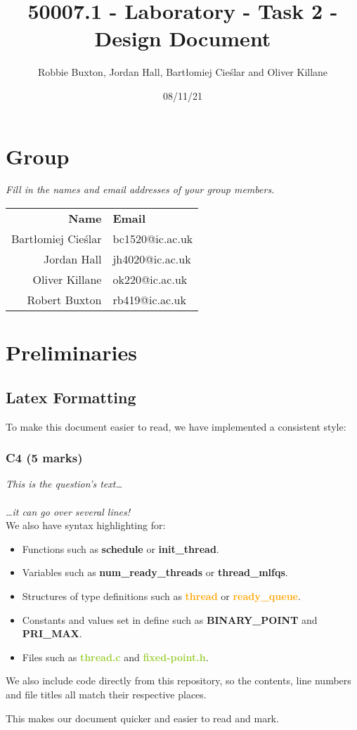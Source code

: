 \documentclass{report}
\title{50007.1 - Laboratory - Task 2 - Design Document}
\author{Robbie Buxton, Jordan Hall, Bartłomiej Cieślar and Oliver Killane}
\date{08/11/21}
\newcommand{\question}[1]{\textit{#1} \ }
\newcommand{\fun}[1]{\textcolor{Emerald}{\textbf{#1}}}
\newcommand{\file}[1]{\textcolor{YellowGreen}{\textbf{#1}}}
\newcommand{\struct}[1]{\textcolor{orange}{\textbf{#1}}}
\newcommand{\var}[1]{\textcolor{RoyalPurple}{\textbf{#1}}}
\newcommand{\const}[1]{\textcolor{BrickRed}{\textbf{#1}}}
\newcommand{\pintoscode}[4]{}
\newcommand{\pintosfile}[3]{\pintoscode{#1}{#2}{\file{#3}}{#3}}
\begin{document}
    \maketitle

    \section*{Group}
        \question{Fill in the names and email addresses of your group members.}
        \begin{center}
            \begin{tabular}{r l}
                \textbf{Name} & \textbf{Email} \\
                Bartłomiej Cieślar & bc1520@ic.ac.uk \\
                Jordan Hall & jh4020@ic.ac.uk \\
                Oliver Killane & ok220@ic.ac.uk \\
                Robert Buxton & rb419@ic.ac.uk \\
            \end{tabular}
        \end{center}
    
    \section*{Preliminaries}
        \subsection*{Latex Formatting}
        To make this document easier to read, we have implemented a consistent style:
        \subsubsection*{C4 (5 marks)}
        \question{This is the question's text\dots
        \\
        \\ \dots it can go over several lines!}
        \\ We also have syntax highlighting for:
        \begin{itemize}
            \item Functions such as \fun{schedule} or \fun{init\_thread}.
            \item Variables such as \var{num\_ready\_threads} or \var{thread\_mlfqs}.
            \item Structures of type definitions such as \struct{thread} or \struct{ready\_queue}.
            \item Constants and values set in define such as \const{BINARY\_POINT} and \const{PRI\_MAX}.
            \item Files such as \file{thread.c} and \file{fixed-point.h}.
        \end{itemize}
        We also include code directly from this repository, so the contents, line numbers and file titles all match their respective places.
        \pintosfile{98}{110}{syscall.c}
        This makes our document quicker and easier to read and mark.
    
\end{document}
